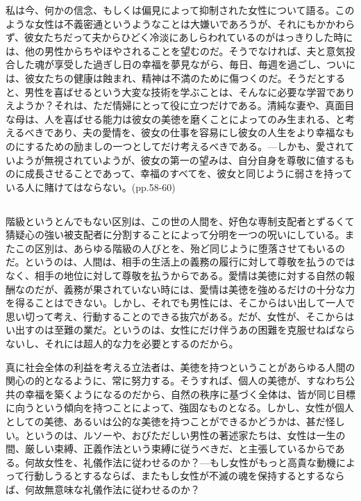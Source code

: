   私は今、何かの信念、もしくは偏見によって抑制された女性について語る。このような女性は不義密通というようなことは大嫌いであろうが、それにもかかわらず、彼女たちだって夫からひどく冷淡にあしらわれているのがはっきりした時には、他の男性からちやほやされることを望むのだ。そうでなければ、夫と意気投合した魂が享受した過ぎし日の幸福を夢見ながら、毎日、毎週を過ごし、ついには、彼女たちの健康は蝕まれ、精神は不満のために傷つくのだ。そうだとすると、男性を喜ばせるという大変な技術を学ぶことは、そんなに必要な学習でありえようか？それは、ただ情婦にとって役に立つだけである。清純な妻や、真面目な母は、人を喜ばせる能力は彼女の美徳を磨くことによってのみ生まれる、と考えるべきであり、夫の愛情を、彼女の仕事を容易にし彼女の人生をより幸福なものにするための励ましの一つとしてだけ考えるべきである。{\——}しかも、愛されていようが無視されていようが、彼女の第一の望みは、自分自身を尊敬に値するものに成長させることであって、幸福のすべてを、彼女と同じように弱さを持っている人に賭けてはならない。(pp.58-60)



\subsection{}



階級というとんでもない区別は、この世の人間を、好色な専制支配者とずるくて猜疑心の強い被支配者に分割することによって分明を一つの呪いにしている。またこの区別は、あらゆる階級の人びとを、殆ど同じように堕落させてもいるのだ。というのは、人間は、相手の生活上の義務の履行に対して尊敬を払うのではなく、相手の地位に対して尊敬を払うからである。愛情は美徳に対する自然の報酬なのだが、義務が果されていない時には、愛情は美徳を強めるだけの十分な力を得ることはできない。しかし、それでも男性には、そこからはい出して一人で思い切って考え、行動することのできる抜穴がある。だが、女性が、そこからはい出すのは至難の業だ。というのは、女性にだけ伴うあの困難を克服せねばならないし、それには超人的な力を必要とするのだから。

真に社会全体の利益を考える立法者は、美徳を持つということがあらゆる人間の関心の的となるように、常に努力する。そうすれば、個人の美徳が、すなわち公共の幸福を築くようになるのだから、自然の秩序に基づく全体は、皆が同じ目標に向うという傾向を持つことによって、強固なものとなる。しかし、女性が個人としての美徳、あるいは公的な美徳を持つことができるかどうかは、甚だ怪しい。というのは、ルソーや、おびただしい男性の著述家たちは、女性は一生の間、厳しい束縛、正義作法という束縛に従うべきだ、と主張しているからである。何故女性を、礼儀作法に従わせるのか？{\——}もし女性がもっと高貴な動機によって行動しうるとするならば、またもし女性が不滅の魂を保持するとするならば、何故無意味な礼儀作法に従わせるのか？

